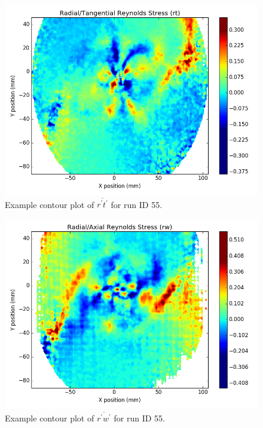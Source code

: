 {\begin{figure}[H]
	\centering
	\includegraphics[width=5in]{figs/example_vortex_figs/example_rt_contour}
\caption{Example contour plot of $\overline{r^\prime t^\prime}$ for run ID 55.}
\label{fig:examp_rt}
\end{figure}

\begin{figure}[H]
	\centering
	\includegraphics[width=5in]{figs/example_vortex_figs/example_rw_contour}
\caption{Example contour plot of $\overline{r^\prime w^\prime}$ for run ID 55.}
\label{fig:examp_rw}
\end{figure}

}
